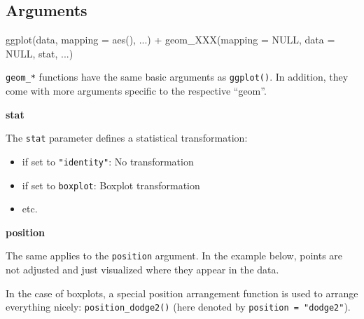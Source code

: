 \documentclass[]{book}
\newenvironment{Shaded}{}{}
\newcommand{\DataTypeTok}[1]{#1}
\newcommand{\KeywordTok}[1]{\textcolor[rgb]{0.00,0.00,1.00}{#1}}
\newcommand{\NormalTok}[1]{#1}
\newcommand{\OperatorTok}[1]{#1}
\newcommand{\OtherTok}[1]{\textcolor[rgb]{1.00,0.25,0.00}{#1}}
\newcommand{\StringTok}[1]{\textcolor[rgb]{0.00,0.50,0.50}{#1}}
\begin{document}
\hypertarget{arguments}{%
\subsection{Arguments}\label{arguments}}

\begin{Shaded}
\begin{Highlighting}[]
\KeywordTok{ggplot}\NormalTok{(data, }\DataTypeTok{mapping =} \KeywordTok{aes}\NormalTok{(), ...) }\OperatorTok{+}
\StringTok{  }\KeywordTok{geom_XXX}\NormalTok{(}\DataTypeTok{mapping =} \OtherTok{NULL}\NormalTok{, }\DataTypeTok{data =} \OtherTok{NULL}\NormalTok{, stat, ...)}
\end{Highlighting}
\end{Shaded}

\texttt{geom\_*} functions have the same basic arguments as \texttt{ggplot()}.
In addition, they come with more arguments specific to the respective ``geom''.

\textbf{stat}

The \texttt{stat} parameter defines a statistical transformation:

\begin{itemize}
\item
  if set to \texttt{"identity"}: No transformation
\item
  if set to \texttt{boxplot}: Boxplot transformation
\item
  etc.
\end{itemize}

\textbf{position}

The same applies to the \texttt{position} argument.
In the example below, points are not adjusted and just visualized where they appear in the data.

In the case of boxplots, a special position arrangement function is used to arrange everything nicely: \texttt{position\_dodge2()} (here denoted by \texttt{position\ =\ "dodge2"}).
\end{document}
